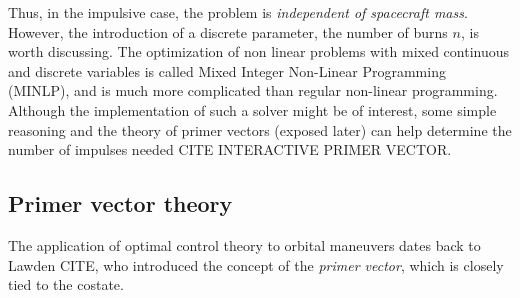 Thus, in the impulsive case, the problem is \textit{independent of spacecraft mass}. However, the introduction of a discrete parameter, the number of burns \(n\), is worth discussing. The optimization of non linear problems with mixed continuous and discrete variables is called Mixed Integer Non-Linear Programming (MINLP), and is much more complicated than regular non-linear programming. Although the implementation of such a solver might be of interest, some simple reasoning and the theory of primer vectors (exposed later) can help determine the number of impulses needed CITE INTERACTIVE PRIMER VECTOR.





\subsection{Primer vector theory}

The application of optimal control theory to orbital maneuvers dates back to Lawden CITE, who introduced the concept of the \textit{primer vector}, which is closely tied to the costate.